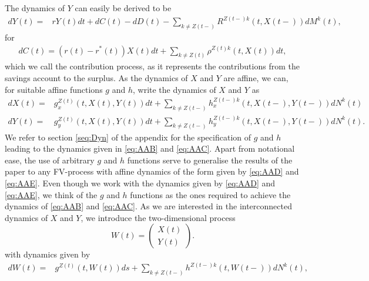 \documentclass[12pt]{article}
\newcommand{\noin}{\noindent}
\theoremstyle{my_thm}
\begin{document}
\noin The dynamics of $Y$ can easily be derived to be
\begin{align}
dY(t)=&rY(t) dt + dC(t)-dD(t)-
\sum_{k \neq Z(t-)}  R^{Z(t-)k}(t,X(t-)) dM^k(t), \label{eq:AAC}
\end{align}
for 
\begin{gather*}
dC(t)=(r(t)-r^*(t))X(t)dt+\sum_{k\neq Z(t)} \rho^{Z(t)k}(t,X(t)) dt,
\end{gather*}
which we call the contribution process, as it represents the contributions from the savings account to the surplus. As the dynamics of $X$ and $Y$ are affine, we can, for suitable affine functions $g$ and $h$, write the dynamics of $X$ and $Y$ as
\begin{align}
dX(t)=&g^{Z(t)}_{x}(t,X(t),Y(t))dt + \sum_{k \neq Z(t-)}  h^{Z(t-)k}_{x}(t,X(t-),Y(t-)) dN^k(t)
\label{eq:AAD}
\\
dY(t)=&g^{Z(t)}_{y}(t,X(t),Y(t))dt + \sum_{k \neq Z(t-)} h^{Z(t-)k}_{y}(t,X(t-), Y(t-)) dN^k(t)
\label{eq:AAE}.
\end{align}
We refer to section \ref{seq:Dyn} of the appendix for the specification of $g$ and $h$ leading to the dynamics given in \eqref{eq:AAB} and \eqref{eq:AAC}. Apart from notational ease, the use of arbitrary $g$ and $h$ functions serve to generalise the results of the paper to any FV-process with affine dynamics of the form given by \eqref{eq:AAD} and \eqref{eq:AAE}. Even though we work with the dynamics given by \eqref{eq:AAD} and \eqref{eq:AAE}, we think of the $g$ and $h$ functions as the ones required to achieve the dynamics of \eqref{eq:AAB} and \eqref{eq:AAC}. As we are interested in the interconnected dynamics of $X$ and $Y$, we introduce the two-dimensional process 
$$
W(t)= \begin{pmatrix}
X(t)\\
Y(t)
\end{pmatrix}.
$$
with dynamics given by
\begin{align*}
dW(t)=& g^{Z(t)}(t,W(t)) ds+ \sum_{k\neq Z(t-)} h^{Z(t-)k}(t,W(t-)) dN^k(t),
\end{align*}
\end{document}
